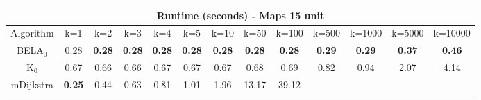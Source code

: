\begin{tabular}{c|cccccccccccc}\toprule
\multicolumn{13}{c}{Runtime (seconds) - Maps 15 unit}\\ \midrule
Algorithm & k=1 & k=2 & k=3 & k=4 & k=5 & k=10 & k=50 & k=100 & k=500 & k=1000 & k=5000 & k=10000 \\ \midrule
BELA$_0$ & 0.28 & \textbf{0.28} & \textbf{0.28} & \textbf{0.28} & \textbf{0.28} & \textbf{0.28} & \textbf{0.28} & \textbf{0.28} & \textbf{0.29} & \textbf{0.29} & \textbf{0.37} & \textbf{0.46} \\
K$_0$ & 0.67 & 0.66 & 0.66 & 0.67 & 0.67 & 0.67 & 0.68 & 0.69 & 0.82 & 0.94 & 2.07 & 4.14 \\
mDijkstra & \textbf{0.25} & 0.44 & 0.63 & 0.81 & 1.01 & 1.96 & 13.17 & 39.12 & -- & -- & -- & -- \\ \bottomrule 
\end{tabular}
